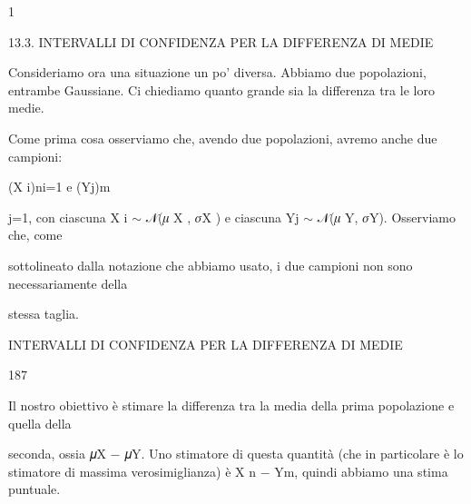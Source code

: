 \documentclass[a4paper,portrait,12pt]{article}
\begin{document}
1





\begin{flushleft}
13.3. INTERVALLI DI CONFIDENZA PER LA DIFFERENZA DI MEDIE
\end{flushleft}


\begin{flushleft}
Consideriamo ora una situazione un po' diversa. Abbiamo due popolazioni, entrambe Gaussiane. Ci chiediamo quanto grande sia la differenza tra le loro medie.
\end{flushleft}


\begin{flushleft}
Come prima cosa osserviamo che, avendo due popolazioni, avremo anche due campioni:
\end{flushleft}


\begin{flushleft}
(X i)ni=1 e (Yj)m
\end{flushleft}


\begin{flushleft}
j=1, con ciascuna X i $\sim$ 𝒩(𝜇 X , 𝜎X ) e ciascuna Yj $\sim$ 𝒩(𝜇 Y, 𝜎Y). Osserviamo che, come
\end{flushleft}


\begin{flushleft}
sottolineato dalla notazione che abbiamo usato, i due campioni non sono necessariamente della
\end{flushleft}


\begin{flushleft}
stessa taglia.
\end{flushleft}





\begin{flushleft}
 INTERVALLI DI CONFIDENZA PER LA DIFFERENZA DI MEDIE
\end{flushleft}





187





\begin{flushleft}
Il nostro obiettivo \`{e} stimare la differenza tra la media della prima popolazione e quella della
\end{flushleft}


\begin{flushleft}
seconda, ossia 𝜇X $-$ 𝜇Y. Uno stimatore di questa quantit\`{a} (che in particolare \`{e} lo stimatore di massima verosimiglianza) \`{e} X n $-$ Ym, quindi abbiamo una stima puntuale.
\end{flushleft}
\end{document}
